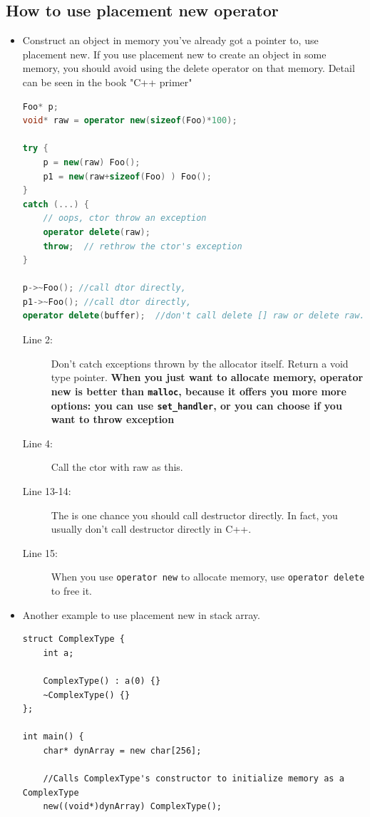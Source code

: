 \documentclass[a4paper,11pt,twoside]{book}
\begin{document}
\subsection{How to use placement new operator}
\begin{itemize}
	\item Construct an object in memory you've already got a pointer to, use placement new. If you use placement new to create an object in some memory, you should avoid using the delete operator on that memory.  Detail can be seen in the book "C++ primer"
\begin{lstlisting}[frame=single, language=c++]
Foo* p;
void* raw = operator new(sizeof(Foo)*100);
	
try {
	p = new(raw) Foo();  
	p1 = new(raw+sizeof(Foo) ) Foo();
}
catch (...) {
	// oops, ctor throw an exception
	operator delete(raw);
	throw;  // rethrow the ctor's exception
}

p->~Foo(); //call dtor directly,
p1->~Foo(); //call dtor directly,
operator delete(buffer);  //don't call delete [] raw or delete raw.
\end{lstlisting}
\begin{description}
	\item[Line 2:] Don't catch exceptions thrown by the allocator itself. Return a void type pointer. \textbf{When you just want to allocate memory, operator new is better than \texttt{malloc}, because it offers you more more options: you can use \texttt{set\_handler}, or you can choose if you want to throw exception}
		
	\item[Line 4:] Call the ctor with raw as this.
	\item[Line 13-14:] The is one chance you should call destructor directly. In fact, you usually don't call destructor directly in C++.
	 \item[Line 15:] When you use \texttt{operator new} to allocate memory, use \texttt{operator delete} to free it. 
\end{description}
	
	\item Another example to use placement new in stack array.
\begin{lstlisting}[numbers=none]
struct ComplexType {
	int a;
	
	ComplexType() : a(0) {}
	~ComplexType() {}
};

int main() {
	char* dynArray = new char[256];
	
	//Calls ComplexType's constructor to initialize memory as a ComplexType
	new((void*)dynArray) ComplexType();
	

\end{lstlisting}
\end{itemize}
\end{document}
